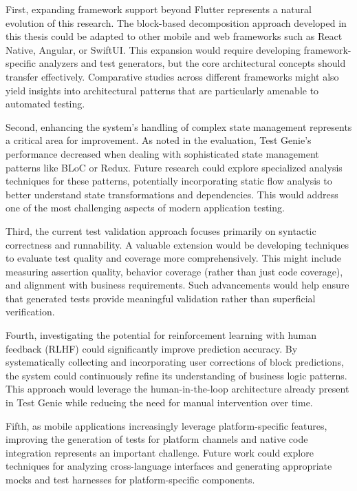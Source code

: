 First, expanding framework support beyond Flutter represents a natural evolution of this research. The block-based decomposition approach developed in this thesis could be adapted to other mobile and web frameworks such as React Native, Angular, or SwiftUI. This expansion would require developing framework-specific analyzers and test generators, but the core architectural concepts should transfer effectively. Comparative studies across different frameworks might also yield insights into architectural patterns that are particularly amenable to automated testing.

Second, enhancing the system's handling of complex state management represents a critical area for improvement. As noted in the evaluation, Test Genie's performance decreased when dealing with sophisticated state management patterns like BLoC or Redux. Future research could explore specialized analysis techniques for these patterns, potentially incorporating static flow analysis to better understand state transformations and dependencies. This would address one of the most challenging aspects of modern application testing.

Third, the current test validation approach focuses primarily on syntactic correctness and runnability. A valuable extension would be developing techniques to evaluate test quality and coverage more comprehensively. This might include measuring assertion quality, behavior coverage (rather than just code coverage), and alignment with business requirements. Such advancements would help ensure that generated tests provide meaningful validation rather than superficial verification.

Fourth, investigating the potential for reinforcement learning with human feedback (RLHF) could significantly improve prediction accuracy. By systematically collecting and incorporating user corrections of block predictions, the system could continuously refine its understanding of business logic patterns. This approach would leverage the human-in-the-loop architecture already present in Test Genie while reducing the need for manual intervention over time.

Fifth, as mobile applications increasingly leverage platform-specific features, improving the generation of tests for platform channels and native code integration represents an important challenge. Future work could explore techniques for analyzing cross-language interfaces and generating appropriate mocks and test harnesses for platform-specific components.

